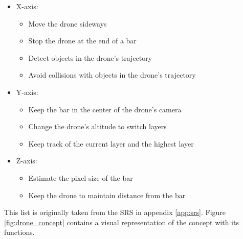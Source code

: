 \begin{itemize}
	\item X-axis:
	\begin{itemize}
		\itemsep0em
		\item Move the drone sideways
		\item Stop the drone at the end of a bar
		\item Detect objects in the drone's trajectory
		\item Avoid collisions with objects in the drone's trajectory
	\end{itemize}
	\item Y-axis:
	\begin{itemize}
		\itemsep0em
		\item Keep the bar in the center of the drone's camera
		\item Change the drone's altitude to switch layers
		\item Keep track of the current layer and the highest layer
	\end{itemize}
	\item Z-axis:
	\begin{itemize}
		\itemsep0em
		\item Estimate the pixel size of the bar
		\item Keep the drone to maintain distance from the bar
	\end{itemize}
\end{itemize}
This list is originally taken from the \gls{SRS} in appendix \ref{app:srs}. Figure \ref{fig:drone_concept} contains a visual representation of the concept with its functions.

